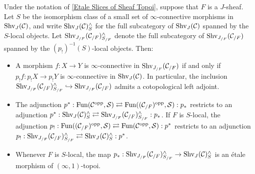 \documentclass[10pt]{article}
\newcommand{\mS}{\mathcal S}
\newcommand{\C}{\mathcal C}
\theoremstyle{witharg}
\theoremstyle{witharg}
\theoremstyle{witharg2}
\begin{document}
\begin{proposition}{}\label{Etale Slices of General Topoi}

    Under the notation of \ref{Etale Slices of Sheaf Topoi}, suppose that $F$ is a $J$-sheaf. Let $S$ be the isomorphism class of a small set of $\infty$-connective morphisms in $\textnormal{Shv}_J(\C)$, and write $\textnormal{Shv}_J(\C)^\wedge_S$ for the full subcategory of $\textnormal{Shv}_J(\C)$ spanned by the $S$-local objects. Let $\textnormal{Shv}_{J_{/F}}(\C_{/F})^\wedge_{S_{/F}}$ denote the full subcategory of $\textnormal{Shv}_{J_{/F}}(\C_{/F})$ spanned by the $(p_!)^{-1}(S)$-local objects. Then:

    \begin{itemize}

        \item [$(1)$] A morphism $f:X\rightarrow Y$ is $\infty$-connective in $\textnormal{Shv}_{J_{/F}}(\C_{/F})$ if and only if $p_!f:p_!X\rightarrow p_!Y$ is $\infty$-connective in $\textnormal{Shv}_J(\C)$. In particular, the inclusion $\textnormal{Shv}_{J_{/F}}(\C_{/F})^\wedge_{S_{/F}}\hookrightarrow \textnormal{Shv}_{J_{/F}}(\C_{/F})$ admits a cotopological left adjoint. 

        \item [$(2)$] The adjunction $p^*:\textnormal{Fun}(\C^{\textnormal{opp}},\mS)\rightleftarrows \textnormal{Fun}((\C_{/F})^{\textnormal{opp}},\mS):p_*$ restricts to an adjunction $p^*:\textnormal{Shv}_{J}(\C)^\wedge_{S}\rightleftarrows \textnormal{Shv}_{J_{/F}}(\C_{/F})^\wedge_{S_{/F}}:p_*$. If $F$ is $S$-local, the adjunction $p_!:\textnormal{Fun}((\C_{/F})^{\textnormal{opp}},\mS)\rightleftarrows\textnormal{Fun}(\C^{\textnormal{opp}},\mS):p^*$ restricts to an adjunction $p_!:\textnormal{Shv}_{J_{/F}}(\C_{/F})^\wedge_{S_{/F}}\rightleftarrows \textnormal{Shv}_{J}(\C)^\wedge_{S}:p^*$. 

        \item [$(3)$] Whenever $F$ is $S$-local, the map $p_*:\textnormal{Shv}_{J_{/F}}(\C_{/F})^\wedge_{S_{/F}}\rightarrow \textnormal{Shv}_{J}(\C)^\wedge_{S}$ is an \'{e}tale morphism of $(\infty,1)$-topoi.
        
    
        
    \end{itemize}

\end{proposition}
\end{document}
